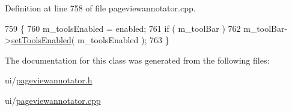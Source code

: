 Definition at line 758 of file pageviewannotator.\+cpp.


\begin{DoxyCode}
759 \{
760     m\_toolsEnabled = enabled;
761     \textcolor{keywordflow}{if} ( m\_toolBar )
762         m\_toolBar->\hyperlink{classPageViewToolBar_a99a0d8cd773f42adfa5420cbd4fa9535}{setToolsEnabled}( m\_toolsEnabled );
763 \}
\end{DoxyCode}


The documentation for this class was generated from the following files\+:\begin{DoxyCompactItemize}
\item 
ui/\hyperlink{pageviewannotator_8h}{pageviewannotator.\+h}\item 
ui/\hyperlink{pageviewannotator_8cpp}{pageviewannotator.\+cpp}\end{DoxyCompactItemize}
